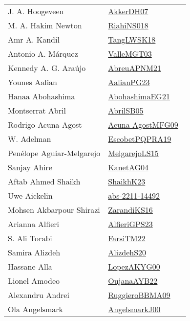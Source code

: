 {\begin{longtable}{p{4cm}p{20cm}}
J. A. Hoogeveen & \href{papers/AkkerDH07.pdf}{AkkerDH07}~\cite{AkkerDH07}\\
M. A. Hakim Newton & \href{papers/RiahiNS018.pdf}{RiahiNS018}~\cite{RiahiNS018}\\
Amr A. Kandil & \href{}{TangLWSK18}~\cite{TangLWSK18}\\
Antonio A. M{\'{a}}rquez & \href{papers/ValleMGT03.pdf}{ValleMGT03}~\cite{ValleMGT03}\\
Kennedy A. G. Ara{\'u}jo & \href{}{AbreuAPNM21}~\cite{AbreuAPNM21}\\
Younes Aalian & \href{papers/AalianPG23.pdf}{AalianPG23}~\cite{AalianPG23}\\
Hanaa Abohashima & \href{articles/AbohashimaEG21.pdf}{AbohashimaEG21}~\cite{AbohashimaEG21}\\
Montserrat Abril & \href{papers/AbrilSB05.pdf}{AbrilSB05}~\cite{AbrilSB05}\\
Rodrigo Acuna{-}Agost & \href{papers/Acuna-AgostMFG09.pdf}{Acuna-AgostMFG09}~\cite{Acuna-AgostMFG09}\\
W. Adelman & \href{articles/EscobetPQPRA19.pdf}{EscobetPQPRA19}~\cite{EscobetPQPRA19}\\
Pen{\'{e}}lope Aguiar{-}Melgarejo & \href{papers/MelgarejoLS15.pdf}{MelgarejoLS15}~\cite{MelgarejoLS15}\\
Sanjay Ahire & \href{}{KanetAG04}~\cite{KanetAG04}\\
Aftab Ahmed Shaikh & \href{}{ShaikhK23}~\cite{ShaikhK23}\\
Uwe Aickelin & \href{articles/abs-2211-14492.pdf}{abs-2211-14492}~\cite{abs-2211-14492}\\
Mohsen Akbarpour Shirazi & \href{articles/ZarandiKS16.pdf}{ZarandiKS16}~\cite{ZarandiKS16}\\
Arianna Alfieri & \href{articles/AlfieriGPS23.pdf}{AlfieriGPS23}~\cite{AlfieriGPS23}\\
S. Ali Torabi & \href{}{FarsiTM22}~\cite{FarsiTM22}\\
Samira Alizdeh & \href{}{AlizdehS20}~\cite{AlizdehS20}\\
Hassane Alla & \href{articles/LopezAKYG00.pdf}{LopezAKYG00}~\cite{LopezAKYG00}\\
Lionel Amodeo & \href{papers/OujanaAYB22.pdf}{OujanaAYB22}~\cite{OujanaAYB22}\\
Alexandru Andrei & \href{articles/RuggieroBBMA09.pdf}{RuggieroBBMA09}~\cite{RuggieroBBMA09}\\
Ola Angelsmark & \href{papers/AngelsmarkJ00.pdf}{AngelsmarkJ00}~\cite{AngelsmarkJ00}\\

\end{longtable}}
